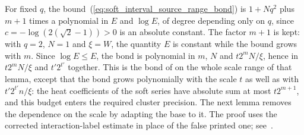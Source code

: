 For fixed $q$, the bound~(\ref{eq:soft_interval_source_range_bond}) is
$1+Nq^2$ plus $m+1$ times a polynomial in $E$ and $\log E$, of degree
depending only on $q$, since $c=-\log(2(\sqrt2-1))>0$ is an absolute
constant. The factor $m+1$ is kept: with $q=2$, $N=1$ and $\xi=W$, the
quantity $E$ is constant while the bound grows with $m$. Since $\log E\leq E$,
the bond is polynomial in $m$, $N$ and $t2^mN/\xi$, hence in
$t2^mN/\xi$ and $t'2^{t'}$ together. This is the bond of
\cite[Lemma on efficient soft truncation, lines 1262--1268]{Arad2016RigorousRG}
on the whole scale range of that lemma, except that the bond grows
polynomially with the scale $t$ as well as with $t'2^{t'}n/\xi$: the heat
coefficients of the soft series have absolute sum at most $t2^{m+1}$, and
this budget enters the required cluster precision. The next lemma
removes the dependence on the scale by adapting the base to it. The proof uses the corrected interaction-label estimate in
place of the false printed one; see~\cite{gap:alvv16_cluster_approximation}.

